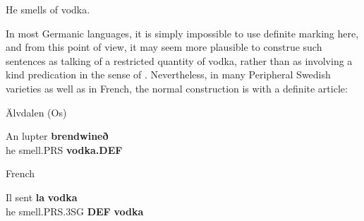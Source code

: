 
\item 

He smells of vodka.



In most Germanic languages, it is simply impossible to use definite marking here, and from this point of view, it may seem more plausible to construe such sentences as talking of a restricted quantity of vodka, rather than as involving a kind predication in the sense of \citet{KrifkaEtAl1995}. Nevertheless, in many Peripheral Swedish varieties as well as in French, the normal construction is with a definite article: 


\item 

Älvdalen (Os)



 \ea\label{}
\gll An  lupter  \textbf{brendwineð}\\


he  smell.PRS  \textbf{vodka.DEF}\\

\item 

French



 \ea\label{}
\gll Il  sent  \textbf{la} \textbf{vodka}\\


he  smell.PRS.3SG  \textbf{DEF} \textbf{vodka}\\

